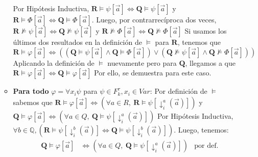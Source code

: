 \documentclass{article}
\begin{document}
\begin{itemize}
\begin{itemize}
                \hspace*{0.5cm} Por Hipótesis Inductiva, $\mathbf{R}\vDash\psi[\vec{a}]\iff\mathbf{Q}\vDash\psi[\vec{a}]$ y $\mathbf{R}\vDash\Phi[\vec{a}]\iff\mathbf{Q}\vDash\Phi[\vec{a}]$. \newline
                \hspace*{0.5cm} Luego, por contrarrecíproca dos veces, $\mathbf{R}\not\vDash\psi[\vec{a}]\iff\mathbf{Q}\not\vDash\psi[\vec{a}]$ y $\mathbf{R}\not\vDash\Phi[\vec{a}]\iff\mathbf{Q}\not\vDash\Phi[\vec{a}]$ \newline
                \hspace*{0.5cm} Si usamos los últimos dos resultados en la definición de $\vDash$ para $\mathbf{R}$, tenemos que $\mathbf{R}\vDash\varphi[\vec{a}]\iff((\mathbf{Q}\vDash\psi[\vec{a}]\land\mathbf{Q}\vDash\Phi[\vec{a}])\lor(\mathbf{Q}\not\vDash\psi[\vec{a}]\land\mathbf{Q}\not\vDash\Phi[\vec{a}]))$ \newline
                \hspace*{0.5cm} Aplicando la definición de $\vDash$ nuevamente pero para $\mathbf{Q}$, llegamos a que $\mathbf{R}\vDash\varphi[\vec{a}]\iff\mathbf{Q}\vDash\varphi[\vec{a}]$ \newline
                \hspace*{0.5cm} Por ello, se demuestra para este caso.
          \item \textbf{Para todo} $\varphi=\forall x_i\psi$ para $\psi\in F^\tau_k, x_i\in Var$: \newline
                \hspace*{0.5cm} Por definición de $\vDash$ sabemos que $\mathbf{R}\vDash\varphi[\vec{a}]\iff(\forall a\in R,\ \mathbf{R}\vDash\psi[\downarrow^a_i(\vec{a})])$ y $\mathbf{Q}\vDash\varphi[\vec{a}]\iff(\forall a\in Q,\ \mathbf{Q}\vDash\psi[\downarrow^a_i(\vec{a})])$ \newline
                \hspace*{0.5cm} Por Hipótesis Inductiva, $\forall b\in\mathbb{Q},(\mathbf{R}\vDash\psi[\downarrow^b_i(\vec{a})]\iff\mathbf{Q}\vDash\psi[\downarrow^b_i(\vec{a})])$. \newline
                \hspace*{0.5cm} Luego, tenemos:
                \begin{equation*}
                  \begin{aligned}
                    \mathbf{Q}\vDash\varphi[\vec{a}] & \iff(\forall a\in Q,\ \mathbf{Q}\vDash\psi[\downarrow^a_i(\vec{a})])         & \text{por def.}   \\

\end{aligned}
\end{equation*}
\end{itemize}
\end{itemize}
\end{document}
